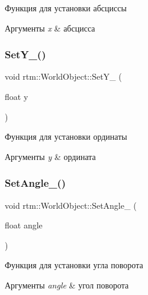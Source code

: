 Функция для установки абсциссы 
\begin{DoxyParams}{Аргументы}
{\em x} & абсцисса \\
\hline
\end{DoxyParams}
\mbox{\label{classrtm_1_1_world_object_a2d9de0f03e711f7b2486889d7336c9d3}} 
\subsubsection{\texorpdfstring{Set\+Y\+\_\+()}{SetY\_()}}
{\footnotesize\ttfamily void rtm\+::\+World\+Object\+::\+Set\+Y\+\_\+ (\begin{DoxyParamCaption}\item[{float}]{y }\end{DoxyParamCaption})\hspace{0.3cm}{\ttfamily [protected]}}

Функция для установки ординаты 
\begin{DoxyParams}{Аргументы}
{\em y} & ордината \\
\hline
\end{DoxyParams}
\mbox{\label{classrtm_1_1_world_object_a3185c36d5138dde6f6942b101586cee4}} 
\subsubsection{\texorpdfstring{Set\+Angle\+\_\+()}{SetAngle\_()}}
{\footnotesize\ttfamily void rtm\+::\+World\+Object\+::\+Set\+Angle\+\_\+ (\begin{DoxyParamCaption}\item[{float}]{angle }\end{DoxyParamCaption})\hspace{0.3cm}{\ttfamily [protected]}}

Функция для установки угла поворота 
\begin{DoxyParams}{Аргументы}
{\em angle} & угол поворота \\
\hline
\end{DoxyParams}
\mbox{\label{classrtm_1_1_world_object_ad11ace9402b562b5c2aa6817c4b1cc9f}} 

